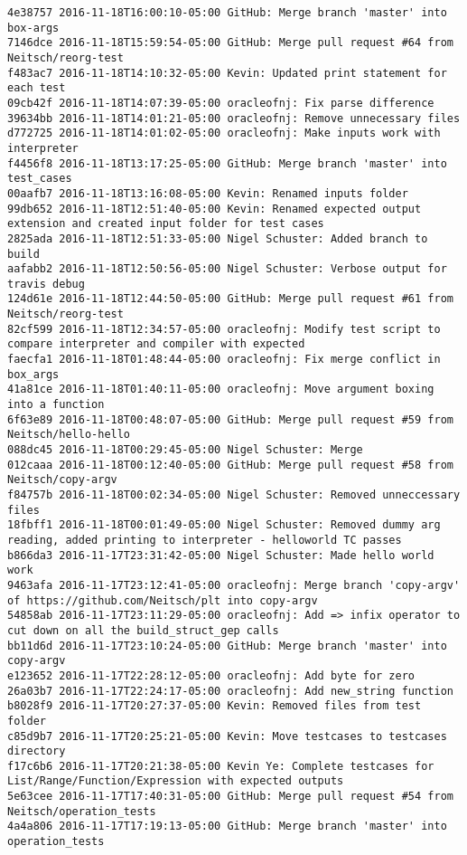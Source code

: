 \begin{lstlisting}
4e38757 2016-11-18T16:00:10-05:00 GitHub: Merge branch 'master' into box-args
7146dce 2016-11-18T15:59:54-05:00 GitHub: Merge pull request #64 from Neitsch/reorg-test
f483ac7 2016-11-18T14:10:32-05:00 Kevin: Updated print statement for each test
09cb42f 2016-11-18T14:07:39-05:00 oracleofnj: Fix parse difference
39634bb 2016-11-18T14:01:21-05:00 oracleofnj: Remove unnecessary files
d772725 2016-11-18T14:01:02-05:00 oracleofnj: Make inputs work with interpreter
f4456f8 2016-11-18T13:17:25-05:00 GitHub: Merge branch 'master' into test_cases
00aafb7 2016-11-18T13:16:08-05:00 Kevin: Renamed inputs folder
99db652 2016-11-18T12:51:40-05:00 Kevin: Renamed expected output extension and created input folder for test cases
2825ada 2016-11-18T12:51:33-05:00 Nigel Schuster: Added branch to build
aafabb2 2016-11-18T12:50:56-05:00 Nigel Schuster: Verbose output for travis debug
124d61e 2016-11-18T12:44:50-05:00 GitHub: Merge pull request #61 from Neitsch/reorg-test
82cf599 2016-11-18T12:34:57-05:00 oracleofnj: Modify test script to compare interpreter and compiler with expected
faecfa1 2016-11-18T01:48:44-05:00 oracleofnj: Fix merge conflict in box_args
41a81ce 2016-11-18T01:40:11-05:00 oracleofnj: Move argument boxing into a function
6f63e89 2016-11-18T00:48:07-05:00 GitHub: Merge pull request #59 from Neitsch/hello-hello
088dc45 2016-11-18T00:29:45-05:00 Nigel Schuster: Merge
012caaa 2016-11-18T00:12:40-05:00 GitHub: Merge pull request #58 from Neitsch/copy-argv
f84757b 2016-11-18T00:02:34-05:00 Nigel Schuster: Removed unneccessary files
18fbff1 2016-11-18T00:01:49-05:00 Nigel Schuster: Removed dummy arg reading, added printing to interpreter - helloworld TC passes
b866da3 2016-11-17T23:31:42-05:00 Nigel Schuster: Made hello world work
9463afa 2016-11-17T23:12:41-05:00 oracleofnj: Merge branch 'copy-argv' of https://github.com/Neitsch/plt into copy-argv
54858ab 2016-11-17T23:11:29-05:00 oracleofnj: Add => infix operator to cut down on all the build_struct_gep calls
bb11d6d 2016-11-17T23:10:24-05:00 GitHub: Merge branch 'master' into copy-argv
e123652 2016-11-17T22:28:12-05:00 oracleofnj: Add byte for zero
26a03b7 2016-11-17T22:24:17-05:00 oracleofnj: Add new_string function
b8028f9 2016-11-17T20:27:37-05:00 Kevin: Removed files from test folder
c85d9b7 2016-11-17T20:25:21-05:00 Kevin: Move testcases to testcases directory
f17c6b6 2016-11-17T20:21:38-05:00 Kevin Ye: Complete testcases for List/Range/Function/Expression with expected outputs
5e63cee 2016-11-17T17:40:31-05:00 GitHub: Merge pull request #54 from Neitsch/operation_tests
4a4a806 2016-11-17T17:19:13-05:00 GitHub: Merge branch 'master' into operation_tests

\end{lstlisting}
